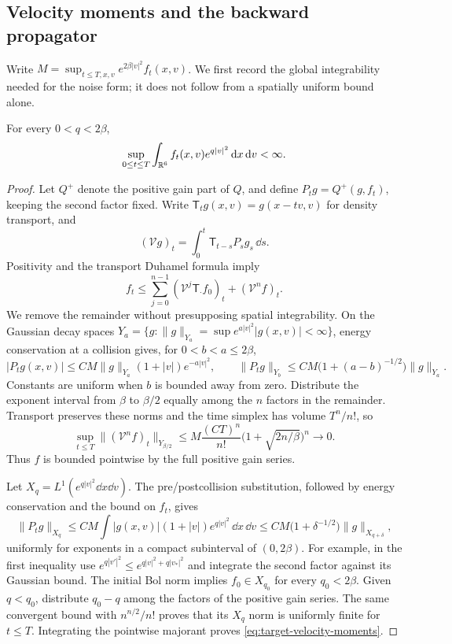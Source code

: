 \subsection{Velocity moments and the backward propagator}

Write $M=\sup_{t\le T,x,v}e^{2\beta|v|^2}f_t(x,v)$.
We first record the global integrability needed for the noise form;
it does not follow from a spatially uniform bound alone.

\begin{lemma}\label{lem:target-moments}
For every $0<q<2\beta$,
\begin{equation}\label{eq:target-velocity-moments}
 \sup_{0\le t\le T}\int_{\mathbb R^6}
       f_t(x,v)e^{q|v|^2}\,\mathrm d x\,\mathrm d v<\infty.
\end{equation}
\end{lemma}

\begin{proof}
Let $Q^+$ denote the positive gain part of $Q$, and define
$P_tg=Q^+(g,f_t)$, keeping the second factor fixed.
Write $\mathsf T_t g(x,v)=g(x-tv,v)$ for density transport, and
\[
 (\mathcal Vg)_t=\int_0^t\mathsf T_{t-s}P_sg_s\,\dd s.
\]
Positivity and the transport Duhamel formula imply
\begin{equation}\label{eq:gain-series-majorant}
 f_t\le\sum_{j=0}^{n-1}
       (\mathcal V^j\mathsf T_{\cdot}f_0)_t
       +(\mathcal V^nf)_t.
\end{equation}
We remove the remainder without presupposing spatial integrability.
On the Gaussian decay spaces
$Y_a=\{g:\|g\|_{Y_a}=\sup e^{a|v|^2}|g(x,v)|<\infty\}$,
energy conservation at a collision gives, for $0<b<a\le2\beta$,
\[
 |P_tg(x,v)|\le CM\|g\|_{Y_a}(1+|v|)e^{-a|v|^2},
 \qquad
 \|P_tg\|_{Y_b}
 \le CM\bigl(1+(a-b)^{-1/2}\bigr)\|g\|_{Y_a}.
\]
Constants are uniform when $b$ is bounded away from zero.  Distribute
the exponent interval from $\beta$ to $\beta/2$ equally among the
$n$ factors in the remainder.  Transport preserves these norms and
the time simplex has volume $T^n/n!$, so
\[
 \sup_{t\le T}\| (\mathcal V^nf)_t\|_{Y_{\beta/2}}
 \le M\frac{(CT)^n}{n!}
        \bigl(1+\sqrt{2n/\beta}\bigr)^n\longrightarrow0.
\]
Thus $f$ is bounded pointwise by the full positive gain series.

Let $X_q=L^1(e^{q|v|^2}\dd x\dd v)$.  The pre/postcollision
substitution, followed by energy conservation and the bound on $f_t$,
gives
\[
 \|P_tg\|_{X_q}
 \le CM\int |g(x,v)|(1+|v|)e^{q|v|^2}\,\dd x\,\dd v
 \le CM\bigl(1+\delta^{-1/2}\bigr)\|g\|_{X_{q+\delta}},
\]
uniformly for exponents in a compact subinterval of $(0,2\beta)$.
For example, in the first inequality use
$e^{q|v'|^2}\le e^{q|v|^2+q|v_*|^2}$ and integrate the second
factor against its Gaussian bound.  The initial Bol norm implies
$f_0\in X_{q_0}$ for every $q_0<2\beta$.  Given $q<q_0$, distribute
$q_0-q$ among the factors of the positive gain series.  The same
convergent bound with $n^{n/2}/n!$ proves that its $X_q$ norm is
uniformly finite for $t\le T$.  Integrating the pointwise majorant
proves \eqref{eq:target-velocity-moments}.
\end{proof}

